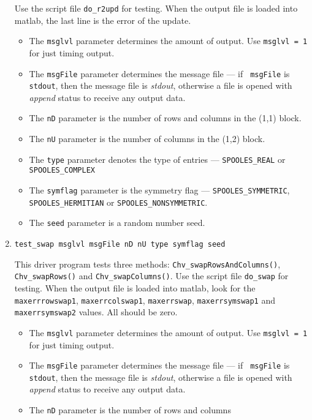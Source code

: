 \begin{enumerate}
Use the script file {\tt do\_r2upd} for testing.
When the output file is loaded into matlab,
the last line is the error of the update.
\par
\begin{itemize}
\item
The {\tt msglvl} parameter determines the amount of output.
Use {\tt msglvl = 1} for just timing output.
\item
The {\tt msgFile} parameter determines the message file --- if {\tt
msgFile} is {\tt stdout}, then the message file is {\it stdout},
otherwise a file is opened with {\it append} status to receive any
output data.
\item
The {\tt nD} parameter is the number of rows and columns 
in the (1,1) block.
\item
The {\tt nU} parameter is the number of columns 
in the (1,2) block.
\item
The {\tt type} parameter denotes the type of entries ---
{\tt SPOOLES\_REAL} or {\tt SPOOLES\_COMPLEX} 
\item
The {\tt symflag} parameter is the symmetry flag ---
{\tt SPOOLES\_SYMMETRIC}, {\tt SPOOLES\_HERMITIAN}
or {\tt SPOOLES\_NONSYMMETRIC}.
\item
The {\tt seed} parameter is a random number seed.
\end{itemize}
\item
\begin{verbatim}
test_swap msglvl msgFile nD nU type symflag seed 
\end{verbatim}
This driver program tests three methods: 
{\tt Chv\_swapRowsAndColumns()},
{\tt Chv\_swapRows()} and
{\tt Chv\_swapColumns()}.
Use the script file {\tt do\_swap} for testing.
When the output file is loaded into matlab,
look for the {\tt maxerrrowswap1}, {\tt maxerrcolswap1},
{\tt maxerrswap}, {\tt maxerrsymswap1} and {\tt maxerrsymswap2} values.
All should be zero.
\par
\begin{itemize}
\item
The {\tt msglvl} parameter determines the amount of output.
Use {\tt msglvl = 1} for just timing output.
\item
The {\tt msgFile} parameter determines the message file --- if {\tt
msgFile} is {\tt stdout}, then the message file is {\it stdout},
otherwise a file is opened with {\it append} status to receive any
output data.
\item
The {\tt nD} parameter is the number of rows and columns 

\end{itemize}
\end{enumerate}
